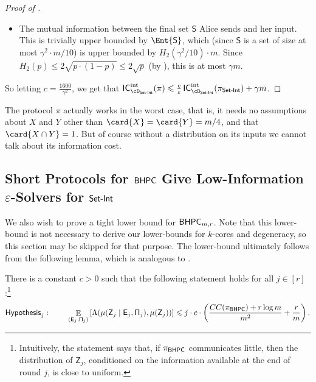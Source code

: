 \documentclass[11pt,letterpaper]{article}
\newcommand{\eps}{\varepsilon}
\DeclareMathOperator*{\E}{\mathbb{E}}
\renewcommand{\leq}{\leqslant}
\renewcommand{\le}{\leq}
\theoremstyle{definition}
\providecommand{\given}
\DeclarePairedDelimiter{\card}\vert\vert
\renewcommand\given{\nonscript\: \delimsize\vert{} \nonscript\: \mathopen{}}
\renewcommand{\given}{\nonscript\: \vert \nonscript\:}
\newcommand{\dsi}{\cD_\SI}
\newcommand{\pisi}{\pi_\SI}
\newcommand{\rPi}{\rv{\Pi}}
\newcommand{\Perm}{\Gamma}
\DeclareMathOperator{\myIC}{\mathsf{IC}}
\newcommand{\IntIC}{\myIC^{\textnormal{int}}}
\newcommand{\bhpc}{\ensuremath{\textnormal{\textsf{BHPC}}}\xspace}
\newcommand{\rX}{\rv{X}}
\newcommand{\rY}{\rv{Y}}
\newcommand{\rv}[1]{\ensuremath{\mathsf{#1}}}
\newcommand{\rZ}{\rv{Z}}
\newcommand{\rE}{\rv{E}}
\newcommand{\SI}{\ensuremath{\textnormal{\textsf{Set-Int}}}\xspace}
\newcommand{\rS}{\rv{S}}
\begin{document}
\begin{proof}[Proof of ]
\begin{itemize}
\[      \leq \sum_{i = 1}^k
      \Inf{\rPi_i ; \Perm_i(\rX) \given \Perm(\rY), R_i} +
      \Inf{\rPi_i ; \Perm_i(\rY) \given \Perm(\rX), R_i},
    \]
    which is exactly $k \cdot \IntIC_{\dsi}(\pisi)$.
  \item The mutual information between the final set $\rS$ Alice sends and
    her input.
    This is trivially upper bounded by $\Ent{\rS}$, which (since $\rS$ is a
    set of size at most $\gamma^2 \cdot m / 10$) is upper bounded by
    $H_2(\gamma^2 / 10) \cdot m$.
    Since $H_2(p) \leq 2\sqrt{p \cdot (1 - p)} \leq 2\sqrt{p}$
    (by ),
    this is at most $\gamma m$.
\end{itemize}
So letting $c = \frac{1600}{\gamma^2}$, we get that $\IntIC_{\dsi}(\pi) \le \frac{c}{\eps} \IntIC_{\dsi}(\pisi) + \gamma m$.
\end{proof}

\begin{remark}
  The protocol $\pi$ actually works in the worst case, that is, it needs no
  assumptions about $X$ and $Y$ other than $\card{X} = \card{Y} = m / 4$, and
  that $\card{X \cap Y} = 1$.
  But of course without a distribution on its inputs we cannot talk about
  its information cost.
\end{remark}





\subsection{\texorpdfstring{Short Protocols for $\bhpc$ Give Low-Information $\eps$-Solvers for $\SI$}{Short Protocols for BHCP Give Low-Information eps-Solvers for Set Intersection}}\label{sec:eps-solving-to-bhpc}



We also wish to prove a tight lower bound for $\bhpc_{m,r}$. Note that this lower-bound is not necessary to derive our lower-bounds for $k$-cores and degeneracy, so this section may be skipped for that purpose. The lower-bound ultimately follows from the following lemma, which is analogous to .

\begin{lemma}\label{lem:nonmhpc-dist}
There is a constant $c > 0$ such that the following statement holds for all $j
\in [r]$:\footnote{Intuitively, the statement says that, if $\pi_\bhpc$
communicates little, then the distribution of $\rZ_j$, conditioned on the
information available at the end of round $j$, is close to uniform.}
\[
\mathsf{Hypothesis}_j:\;\;\;\;\;\;\;\;\E_{(\rE_j, \rPi_j)}\left[\Lambda(\mu(\rZ_j \mid \rE_j, \rPi_j), \mu(\rZ_j))\right] \leq j \cdot c \cdot \left( \frac{CC(\pi_\bhpc)+r\log m}{m^2} + \frac{r} m\right).
\] 

\end{lemma}
\end{document}

